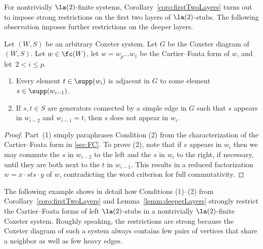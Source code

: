 For nontrivially $\la(2)$-finite systems, Corollary~\ref{coro:firstTwoLayers} turns out to impose strong
restrictions on the first two layers of $\la(2)$-stubs.  The following observation imposes further
restrictions on the deeper layers. 

\begin{lemma}
    \label{lemm:deeperLayers}
    Let $(W,S)$ be an arbitrary Coxeter system. Let $G$ be the Coxeter diagram
    of $(W,S)$. Let $w\in \fc(W)$, let $w=w_p\dots w_1$ be the Cartier--Foata form of $w$, and let~$2<i\le p$. 
    \begin{enumerate}
        \item Every element $t\in \supp(w_i)$ is adjacent in $G$ to some element $s\in \supp(w_{i-1})$.  
        \item If $s,t\in S$ are generators connected by a simple edge in $G$ such that $s$ appears in $w_{i-2}$ and
             $w_{i-1}=t$, then $s$ does not appear in $w_i$.  
    \end{enumerate}
\end{lemma}

\begin{proof}
    Part~(1) simply paraphrases Condition (2) from the characterization of the Cartier--Foata form
    in \autoref{sec:FC}. To prove (2), note that if $s$ appears in $w_{i}$ then we may commute the
    $s$ in $w_{i-2}$ to the left and the $s$ in $w_i$ to the right, if necessary, until they are
    both next to the $t$ in $w_{i-1}$. This results in a reduced factorization $w=x \cdot sts\cdot
    y$ of $w$, contradicting the word criterion for full commutativity. 
\end{proof}

The following example shows in detail how Conditions (1)--(2) from Corollary~\ref{coro:firstTwoLayers} and
Lemma~\ref{lemm:deeperLayers} strongly restrict the Cartier--Foata forms of left $\la(2)$-stubs in a
nontrivially $\la(2)$-finite Coxeter system.  Roughly speaking, the restrictions are strong because
the Coxeter diagram of such a system always contains few pairs of vertices that share a neighbor as
well as few heavy edges.

